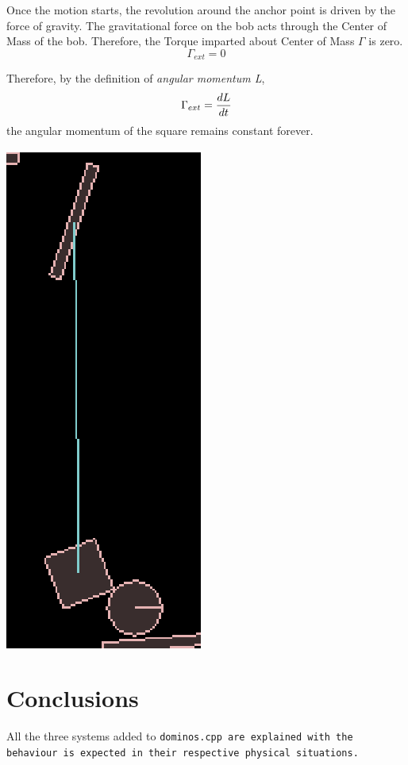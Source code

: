 \documentclass[11pt]{article}%
\begin{document}
Once the motion starts, the revolution around the anchor point is driven by the force of gravity. The gravitational force on the bob acts through the Center of Mass of the bob. Therefore, the Torque imparted about Center of Mass $\Gamma$ is zero.\begin{equation}\Gamma_{ext}=0\end{equation}

Therefore, by the definition of \emph{angular momentum L}, \begin{equation}\Gamma_{ext}={dL\over dt}\end{equation}
the angular momentum of the square remains constant forever.\cite{resnick}
\vskip 0.5in
\centerline{\includegraphics[scale=0.8]{sqpendulumexe}}
\vskip 0.3in
\section{Conclusions}
All the three systems added to \tt dominos.cpp \rm are explained with the behaviour is expected in their respective physical situations.



\end{document}
